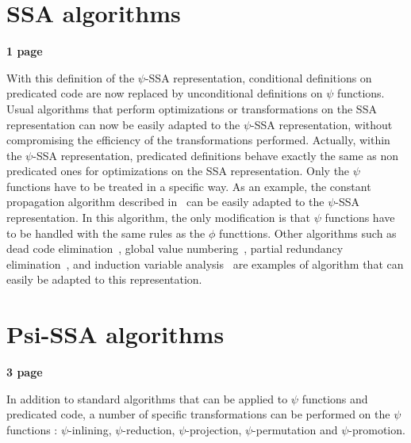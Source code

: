 \section{SSA algorithms}

\textbf{1 page}


With this definition of the $\psi$-SSA representation, conditional
definitions on predicated code are now replaced by unconditional
definitions on $\psi$ functions. Usual algorithms that perform
optimizations or transformations on the SSA representation can now be
easily adapted to the $\psi$-SSA representation, without compromising
the efficiency of the transformations performed. Actually, within the
$\psi$-SSA representation, predicated definitions behave exactly the
same as non predicated ones for optimizations on the SSA
representation. Only the $\psi$ functions have to be treated in a
specific way. As an example, the constant propagation algorithm
described in~\cite{WZ91} can be easily adapted to the $\psi$-SSA
representation. In this algorithm, the only modification is that
$\psi$ functions have to be handled with the same rules as the $\phi$
functtions. Other algorithms such as dead code
elimination~\cite{morgan98}, global value numbering~\cite{Cli95},
partial redundancy elimination~\cite{CCK+97}, and induction variable
analysis~\cite{Wolfe92} are examples of algorithm that can easily be
adapted to this representation.

\section{Psi-SSA algorithms}

\textbf{3 page}


In addition to standard algorithms that can be applied to $\psi$
functions and predicated code, a number of specific transformations
can be performed on the $\psi$ functions : $\psi$-inlining,
$\psi$-reduction, $\psi$-projection, $\psi$-permutation and
$\psi$-promotion.

